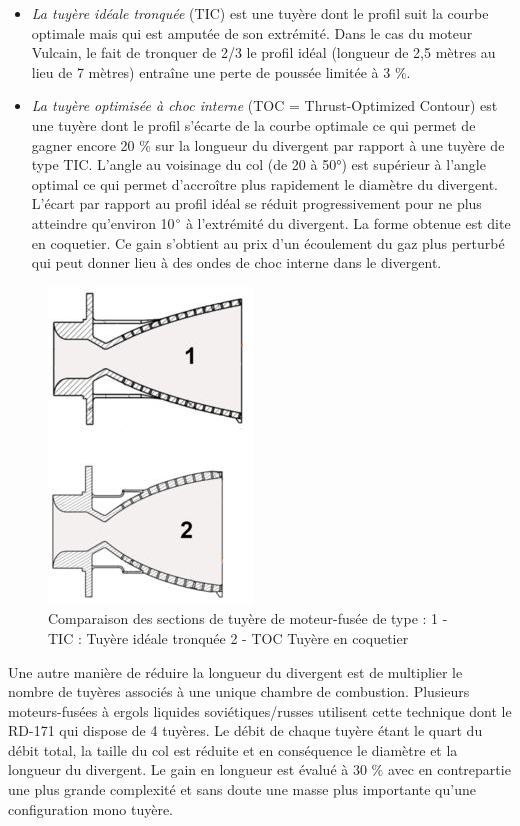 \documentclass{report}
\begin{document}
\begin{itemize}
    \item \textit{La tuyère idéale tronquée} (TIC) est une tuyère dont le profil suit la courbe optimale mais qui est amputée de son extrémité. Dans le cas du moteur Vulcain, le fait de tronquer de 2/3 le profil idéal (longueur de 2,5 mètres au lieu de 7 mètres) entraîne une perte de poussée limitée à 3 $\%$.
    \item \textit{La tuyère optimisée à choc interne} (TOC = Thrust-Optimized Contour) est une tuyère dont le profil s'écarte de la courbe optimale ce qui permet de gagner encore 20 $\%$ sur la longueur du divergent par rapport à une tuyère de type TIC. L'angle au voisinage du col (de 20 à 50°) est supérieur à l'angle optimal ce qui permet d'accroître plus rapidement le diamètre du divergent. L'écart par rapport au profil idéal se réduit progressivement pour ne plus atteindre qu'environ 10$\degree$ à l'extrémité du divergent. La forme obtenue est dite en coquetier. Ce gain s'obtient au prix d'un écoulement du gaz plus perturbé qui peut donner lieu à des ondes de choc interne dans le divergent.
\end{itemize}

\begin{figure}[h!]
    \centering
    \includegraphics[scale=0.7]{48.JPG}
    \caption{Comparaison des sections de tuyère de moteur-fusée de type : 1 - TIC : Tuyère idéale tronquée 2 - TOC Tuyère en coquetier}
    \label{48}
\end{figure}

Une autre manière de réduire la longueur du divergent est de multiplier le nombre de tuyères associés à une unique chambre de combustion. Plusieurs moteurs-fusées à ergols liquides soviétiques/russes utilisent cette technique dont le RD-171 qui dispose de 4 tuyères. Le débit de chaque tuyère étant le quart du débit total, la taille du col est réduite et en conséquence le diamètre et la longueur du divergent. Le gain en longueur est évalué à 30 $\%$ avec en contrepartie une plus grande complexité et sans doute une masse plus importante qu'une configuration mono tuyère.
\end{document}
